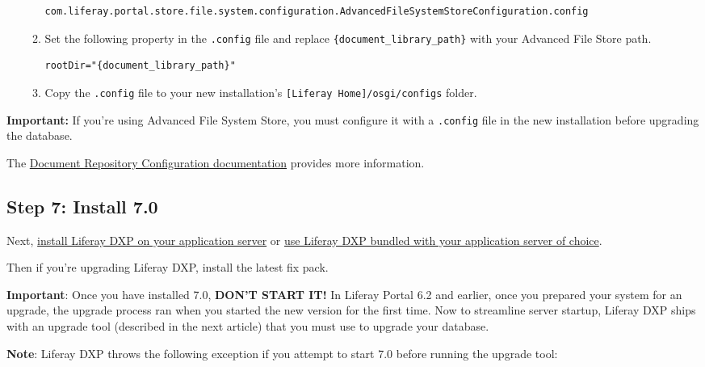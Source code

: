\begin{enumerate}
\begin{enumerate}
\begin{verbatim}
com.liferay.portal.store.file.system.configuration.AdvancedFileSystemStoreConfiguration.config
\end{verbatim}
  \item
    Set the following property in the \texttt{.config} file and replace
    \texttt{\{document\_library\_path\}} with your Advanced File Store
    path.

\begin{verbatim}
rootDir="{document_library_path}"
\end{verbatim}
  \item
    Copy the \texttt{.config} file to your new installation's
    \texttt{{[}Liferay\ Home{]}/osgi/configs} folder.
  \end{enumerate}
\end{enumerate}

\noindent\hrulefill

\textbf{Important:} If you're using Advanced File System Store, you must
configure it with a \texttt{.config} file in the new installation before
upgrading the database.

\noindent\hrulefill

The
\href{/docs/7-0/deploy/-/knowledge_base/d/document-repository-configuration}{Document
Repository Configuration documentation} provides more information.

\subsection{Step 7: Install 7.0}\label{step-7-install-7.0}

Next,
\href{/docs/7-0/deploy/-/knowledge_base/d/deploying-product}{install
Liferay DXP on your application server} or
\href{/docs/7-0/deploy/-/knowledge_base/d/installing-product}{use
Liferay DXP bundled with your application server of choice}.

Then if you're upgrading Liferay DXP, install the latest fix pack.

\textbf{Important}: Once you have installed 7.0, \textbf{DON'T START
IT!} In Liferay Portal 6.2 and earlier, once you prepared your system
for an upgrade, the upgrade process ran when you started the new version
for the first time. Now to streamline server startup, Liferay DXP ships
with an upgrade tool (described in the next article) that you must use
to upgrade your database.

\noindent\hrulefill

\textbf{Note}: Liferay DXP throws the following exception if you attempt
to start 7.0 before running the upgrade tool:

